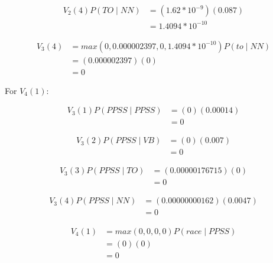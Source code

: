 \documentclass[10pt,a4paper]{article}
\begin{document}
\begin{equation}
\begin{split}
V_2(4)P(TO\mid NN) &= (1.62*10^{-9})(0.087) \\
 &= 1.4094*10^{-10}
\end{split}
\end{equation}

\begin{equation}
\begin{split}
V_3(4) &= max(0,0.000002397,0,1.4094*10^{-10})P(to\mid NN) \\
 &=(0.000002397)(0) \\
 &=0
\end{split}
\end{equation}



For $V_4(1):$

\begin{equation}
\begin{split}
V_3(1)P(PPSS\mid PPSS) &= (0)(0.00014) \\
&= 0
\end{split}
\end{equation}

\begin{equation}
\begin{split}
V_3(2)P(PPSS\mid VB) &= (0)(0.007) \\
 &= 0
\end{split}
\end{equation}

\begin{equation}
\begin{split}
V_3(3)P(PPSS\mid TO) &= (0.00000176715)(0) \\
&= 0
\end{split}
\end{equation}

\begin{equation}
\begin{split}
V_3(4)P(PPSS\mid NN) &= (0.00000000162)(0.0047) \\
 &= 0
\end{split}
\end{equation}

\begin{equation}
\begin{split}
V_4(1) &= max(0,0,0,0)P(race\mid PPSS) \\
 &=(0)(0) \\
 &=0
\end{split}
\end{equation}
\end{document}
